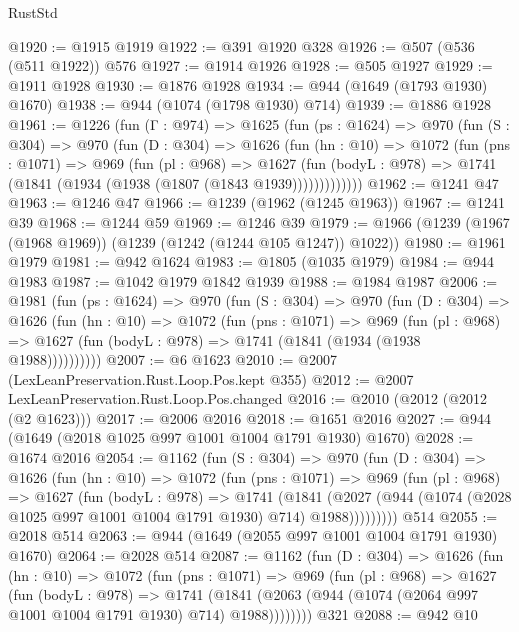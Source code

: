 \begin{lexlean}{RustStd}
\begin{coremodule}
{\begin{coremodule}
{{{{{{{{{{@1920 := @1915 @1919
@1922 := @391 @1920 @328
@1926 := @507 (@536 (@511 @1922)) @576
@1927 := @1914 @1926
@1928 := @505 @1927
@1929 := @1911 @1928
@1930 := @1876 @1928
@1934 := @944 (@1649 (@1793 @1930) @1670)
@1938 := @944 (@1074 (@1798 @1930) @714)
@1939 := @1886 @1928
@1961 := @1226
    (fun (Γ : @974) =>
    @1625
      (fun (ps : @1624) =>
      @970
        (fun (S : @304) =>
        @970
          (fun (D : @304) =>
          @1626
            (fun (hn : @10) =>
            @1072
              (fun (pns : @1071) =>
              @969
                (fun (pl : @968) =>
                @1627
                  (fun (bodyL : @978) => @1741 (@1841 (@1934 (@1938 (@1807 (@1843 @1939)))))))))))))
@1962 := @1241 @47
@1963 := @1246 @47
@1966 := @1239 (@1962 (@1245 @1963))
@1967 := @1241 @39
@1968 := @1244 @59
@1969 := @1246 @39
@1979 := @1966 (@1239 (@1967 (@1968 @1969)) (@1239 (@1242 (@1244 @105 @1247)) @1022))
@1980 := @1961 @1979
@1981 := @942 @1624
@1983 := @1805 (@1035 @1979)
@1984 := @944 @1983
@1987 := @1042 @1979 @1842 @1939
@1988 := @1984 @1987
@2006 := @1981
    (fun (ps : @1624) =>
    @970
      (fun (S : @304) =>
      @970
        (fun (D : @304) =>
        @1626
          (fun (hn : @10) =>
          @1072
            (fun (pns : @1071) =>
            @969
              (fun (pl : @968) =>
              @1627 (fun (bodyL : @978) => @1741 (@1841 (@1934 (@1938 @1988))))))))))
@2007 := @6 @1623
@2010 := @2007 (LexLeanPreservation.Rust.Loop.Pos.kept @355)
@2012 := @2007 LexLeanPreservation.Rust.Loop.Pos.changed
@2016 := @2010 (@2012 (@2012 (@2 @1623)))
@2017 := @2006 @2016
@2018 := @1651 @2016
@2027 := @944 (@1649 (@2018 @1025 @997 @1001 @1004 @1791 @1930) @1670)
@2028 := @1674 @2016
@2054 := @1162
    (fun (S : @304) =>
    @970
      (fun (D : @304) =>
      @1626
        (fun (hn : @10) =>
        @1072
          (fun (pns : @1071) =>
          @969
            (fun (pl : @968) =>
            @1627
              (fun (bodyL : @978) =>
              @1741
                (@1841
                  (@2027
                    (@944 (@1074 (@2028 @1025 @997 @1001 @1004 @1791 @1930) @714) @1988)))))))))
    @514
@2055 := @2018 @514
@2063 := @944 (@1649 (@2055 @997 @1001 @1004 @1791 @1930) @1670)
@2064 := @2028 @514
@2087 := @1162
    (fun (D : @304) =>
    @1626
      (fun (hn : @10) =>
      @1072
        (fun (pns : @1071) =>
        @969
          (fun (pl : @968) =>
          @1627
            (fun (bodyL : @978) =>
            @1741
              (@1841 (@2063 (@944 (@1074 (@2064 @997 @1001 @1004 @1791 @1930) @714) @1988))))))))
    @321
@2088 := @942 @10
}}}}}}}}}}
\end{coremodule}}
\end{coremodule}
\end{lexlean}
